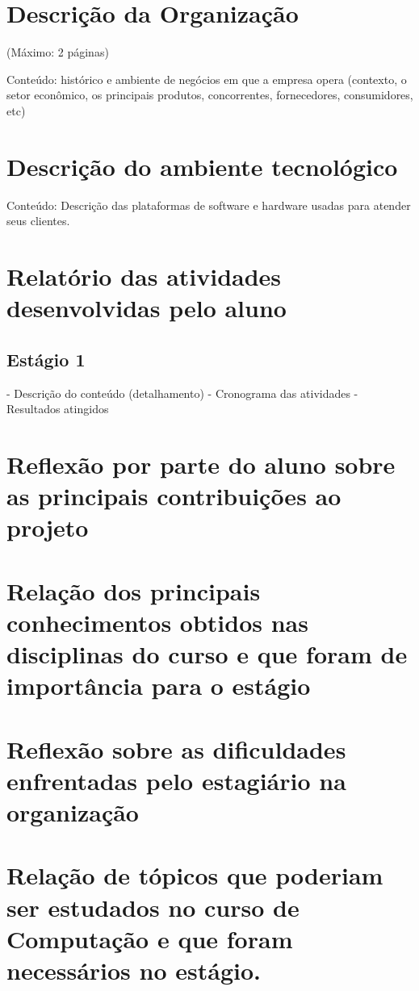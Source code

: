 \documentclass{ufscar}
\begin{document}
\section{Descrição da Organização}
(Máximo: 2 páginas)

Conteúdo: histórico e ambiente de negócios em  que a empresa opera (contexto, o setor econômico, os principais produtos, concorrentes, fornecedores, consumidores, etc)

\section{Descrição do ambiente tecnológico}
Conteúdo: Descrição das plataformas de software e hardware usadas para atender seus clientes.

\section{Relatório das atividades desenvolvidas pelo aluno}
\subsection{Estágio 1}
- Descrição do conteúdo (detalhamento)
- Cronograma das atividades
- Resultados atingidos


\section{Reflexão por parte do aluno sobre as principais contribuições ao projeto}


\section{Relação dos principais conhecimentos obtidos nas disciplinas do curso e que foram de importância para o estágio}


\section{Reflexão sobre as dificuldades enfrentadas pelo estagiário na organização}


\section{Relação de tópicos que poderiam ser estudados no curso de Computação e que foram necessários no estágio.}
\end{document}
